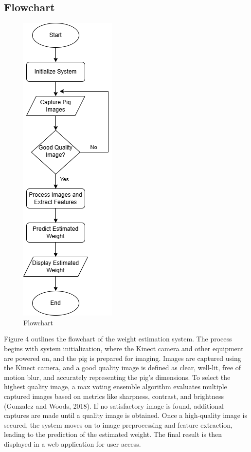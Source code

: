 {\subsection {Flowchart}
\begin{figure}[h]
	\centering
	\includegraphics[height=0.6\textheight]{figures/Thesis Flowchart}
	\caption{Flowchart}
	\label{fig:Flowchart}
\end{figure}

Figure 4 outlines the flowchart of the weight estimation system. The process begins with system initialization, where the Kinect camera and other equipment are powered on, and the pig is prepared for imaging. Images are captured using the Kinect camera, and a good quality image is defined as clear, well-lit, free of motion blur, and accurately representing the pig's dimensions. To select the highest quality image, a max voting ensemble algorithm evaluates multiple captured images based on metrics like sharpness, contrast, and brightness (Gonzalez and Woods, 2018). If no satisfactory image is found, additional captures are made until a quality image is obtained. Once a high-quality image is secured, the system moves on to image preprocessing and feature extraction, leading to the prediction of the estimated weight. The final result is then displayed in a web application for user access.
}
